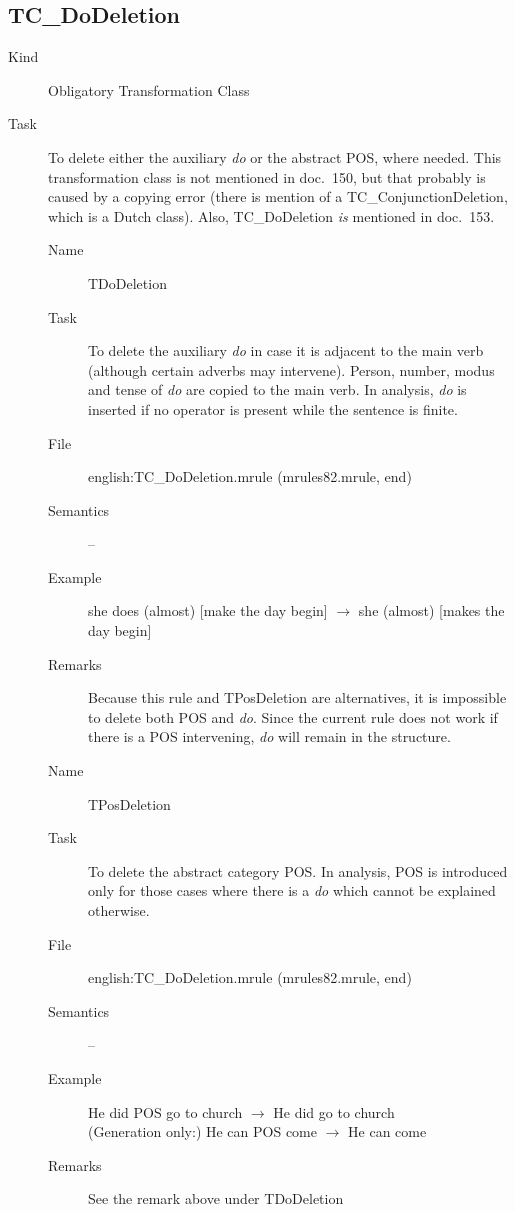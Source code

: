 \subsection{TC\_DoDeletion}
\begin{description}
\item[Kind] Obligatory Transformation Class
\item[Task] To delete either the auxiliary {\em do\/} or the abstract POS, 
where needed. This transformation class is not mentioned in doc.\ 150, but that 
probably is caused by a copying error (there is mention of a 
TC\_ConjunctionDeletion, which is a Dutch class). Also, TC\_DoDeletion {\em is 
\/} mentioned in doc.\ 153.

\vspace{1 cm}
\begin{description}
\item[Name] TDoDeletion
\item[Task] To delete the auxiliary {\em do\/} in case it is adjacent to the 
main verb (although certain adverbs may intervene). Person, number, modus and 
tense of {\em do\/} are copied to the main verb. In analysis, {\em do\/} is 
inserted if no operator is present while the sentence is finite.
\item[File] english:TC\_DoDeletion.mrule (mrules82.mrule, end)
\item[Semantics] --
\item[Example] she does (almost) [make the day begin] $\rightarrow$ she 
(almost) [makes the day begin]
\item[Remarks] Because this rule and TPosDeletion are alternatives, it is 
impossible to delete both POS and {\em do\/}. Since the current rule does not 
work if there is a POS intervening, {\em do\/} will remain in the structure.
\end{description}

\vspace{1 cm}
\begin{description}
\item[Name] TPosDeletion
\item[Task] To delete the abstract category POS. In analysis, POS is introduced 
only for those cases where there is a {\em do\/} which cannot be explained 
otherwise.
\item[File] english:TC\_DoDeletion.mrule (mrules82.mrule, end)
\item[Semantics] --
\item[Example] He did POS go to church $\rightarrow$ He did go to church\\
(Generation only:) He can POS come $\rightarrow$ He can come
\item[Remarks] See the remark above under TDoDeletion
\end{description}


\end{description}
